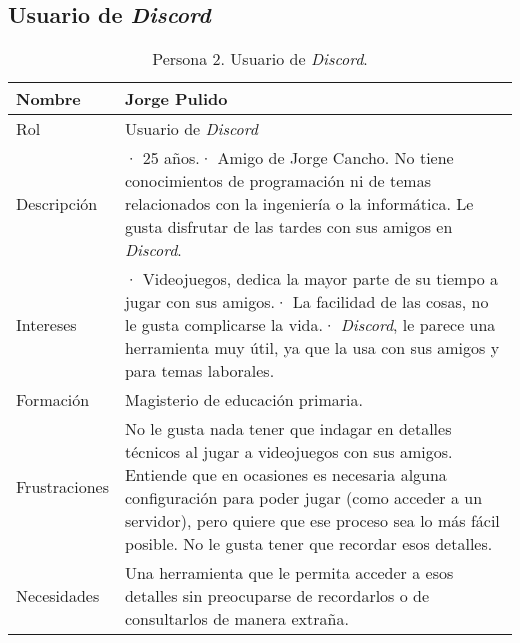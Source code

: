 \subsection{Usuario de \textit{Discord}}
\label{sec:personaUsuarioDiscord}
\begin{table}[H]
    \centering
    \def\arraystretch{1.25}
    \begin{adjustbox}{max width=\textwidth}
    \begin{tabularx}{\textwidth}{|l|L|}
    \hline
        \textbf{Nombre} & \textbf{Jorge Pulido} \\ \hline
    \hline
        Rol & Usuario de \textit{Discord} \\ \hline
        Descripción & · 25 años.\linebreak · Amigo de Jorge Cancho. No tiene conocimientos de programación ni de temas relacionados con la ingeniería o la informática. Le gusta disfrutar de las tardes con sus amigos en \textit{Discord}. \\ \hline
        Intereses & · Videojuegos, dedica la mayor parte de su tiempo a jugar con sus amigos.\linebreak · La facilidad de las cosas, no le gusta complicarse la vida.\linebreak · \textit{Discord}, le parece una herramienta muy útil, ya que la usa con sus amigos y para temas laborales. \\ \hline
        Formación & Magisterio de educación primaria. \\ \hline
        Frustraciones & No le gusta nada tener que indagar en detalles técnicos al jugar a videojuegos con sus amigos. Entiende que en ocasiones es necesaria alguna configuración para poder jugar (como acceder a un servidor), pero quiere que ese proceso sea lo más fácil posible. No le gusta tener que recordar esos detalles. \\ \hline
        Necesidades & Una herramienta que le permita acceder a esos detalles sin preocuparse de recordarlos o de consultarlos de manera extraña. \\ \hline
    \end{tabularx}
    \end{adjustbox}
    \caption{Persona 2. Usuario de \textit{Discord}.}
\end{table}

